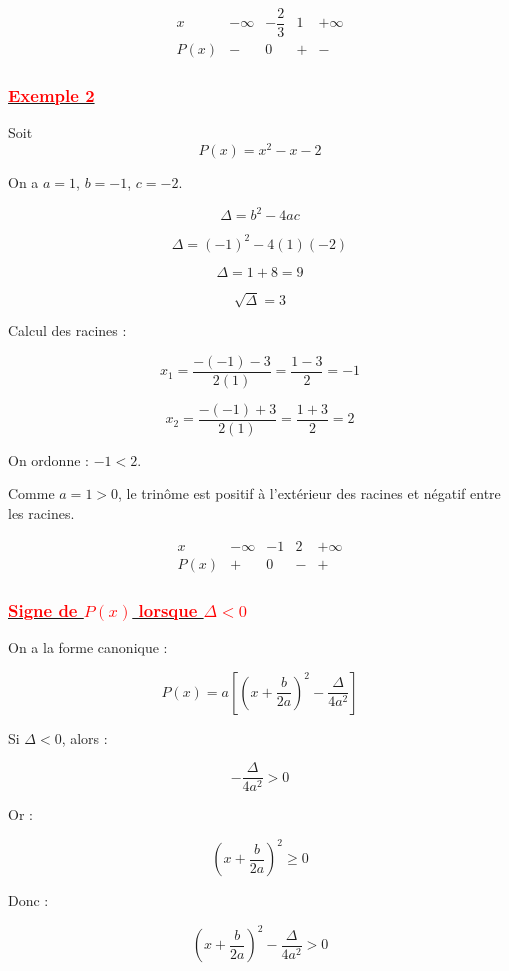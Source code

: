 \documentclass[12pt,a4paper]{article}
\begin{document}
\bigskip

\[
\begin{array}{c|cccc}
x & -\infty & -\dfrac{2}{3} & 1 & +\infty \\
\hline
P(x) & - & 0 & + & -
\end{array}
\]

\subsubsection*{\underline{\textcolor{red}{Exemple 2}}}

Soit 
\[
P(x)=x^2 - x - 2
\]

On a $a=1$, $b=-1$, $c=-2$.

\[
\Delta = b^2 - 4ac
\]

\[
\Delta = (-1)^2 - 4(1)(-2)
\]

\[
\Delta = 1 + 8 = 9
\]

\[
\sqrt{\Delta}=3
\]

\medskip

Calcul des racines :

\[
x_1=\frac{-(-1)-3}{2(1)}=\frac{1-3}{2}=-1
\]

\[
x_2=\frac{-(-1)+3}{2(1)}=\frac{1+3}{2}=2
\]

On ordonne : $-1<2$.

Comme $a=1>0$, le trinôme est positif à l’extérieur des racines
et négatif entre les racines.

\[
\begin{array}{c|cccc}
x & -\infty & -1 & 2 & +\infty \\
\hline
P(x) & + & 0 & - & +
\end{array}
\]

\bigskip
\subsubsection*{\underline{\textcolor{red}{Signe de $P(x)$ lorsque $\Delta<0$}}}

On a la forme canonique :

\[
P(x)=a\left[\left(x+\frac{b}{2a}\right)^2-\frac{\Delta}{4a^2}\right]
\]

Si $\Delta<0$, alors :

\[
-\frac{\Delta}{4a^2} >0
\]

Or :

\[
\left(x+\frac{b}{2a}\right)^2 \geq 0
\]

Donc :

\[
\left(x+\frac{b}{2a}\right)^2 - \frac{\Delta}{4a^2} > 0
\]
\end{document}
